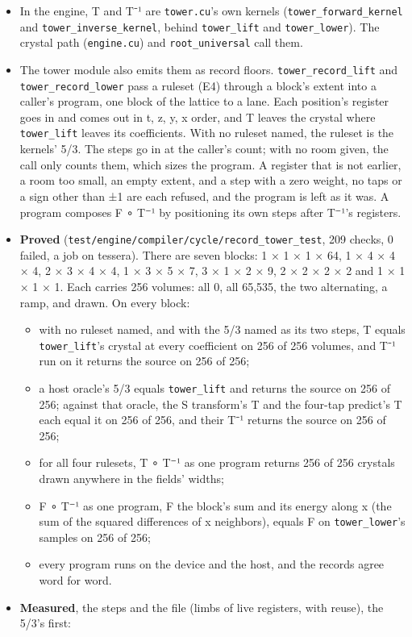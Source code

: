 \begin{itemize}
\begin{itemize}
\begin{itemize}
\item In the engine, T and T⁻¹ are \texttt{tower.\allowbreak{}cu}'s own kernels (\texttt{tower\_\allowbreak{}forward\_\allowbreak{}kernel} and \texttt{tower\_\allowbreak{}inverse\_\allowbreak{}kernel}, behind \texttt{tower\_\allowbreak{}lift} and \texttt{tower\_\allowbreak{}lower}). The crystal path (\texttt{engine.\allowbreak{}cu}) and \texttt{root\_\allowbreak{}universal} call them.
\item The tower module also emits them as record floors. \texttt{tower\_\allowbreak{}record\_\allowbreak{}lift} and \texttt{tower\_\allowbreak{}record\_\allowbreak{}lower} pass a ruleset (E4) through a block's extent into a caller's program, one block of the lattice to a lane. Each position's register goes in and comes out in t, z, y, x order, and T leaves the crystal where \texttt{tower\_\allowbreak{}lift} leaves its coefficients. With no ruleset named, the ruleset is the kernels' 5/3. The steps go in at the caller's count; with no room given, the call only counts them, which sizes the program. A register that is not earlier, a room too small, an empty extent, and a step with a zero weight, no taps or a sign other than ±1 are each refused, and the program is left as it was. A program composes F ∘ T⁻¹ by positioning its own steps after T⁻¹'s registers.
\item \textbf{Proved} (\texttt{test/\allowbreak{}engine/\allowbreak{}compiler/\allowbreak{}cycle/\allowbreak{}record\_\allowbreak{}tower\_\allowbreak{}test}, 209 checks, 0 failed, a job on tessera). There are seven blocks: 1 × 1 × 1 × 64, 1 × 4 × 4 × 4, 2 × 3 × 4 × 4, 1 × 3 × 5 × 7, 3 × 1 × 2 × 9, 2 × 2 × 2 × 2 and 1 × 1 × 1 × 1. Each carries 256 volumes: all 0, all 65,535, the two alternating, a ramp, and drawn. On every block:

\begin{itemize}
\item with no ruleset named, and with the 5/3 named as its two steps, T equals \texttt{tower\_\allowbreak{}lift}'s crystal at every coefficient on 256 of 256 volumes, and T⁻¹ run on it returns the source on 256 of 256;
\item a host oracle's 5/3 equals \texttt{tower\_\allowbreak{}lift} and returns the source on 256 of 256; against that oracle, the S transform's T and the four-tap predict's T each equal it on 256 of 256, and their T⁻¹ returns the source on 256 of 256;
\item for all four rulesets, T ∘ T⁻¹ as one program returns 256 of 256 crystals drawn anywhere in the fields' widths;
\item F ∘ T⁻¹ as one program, F the block's sum and its energy along x (the sum of the squared differences of x neighbors), equals F on \texttt{tower\_\allowbreak{}lower}'s samples on 256 of 256;
\item every program runs on the device and the host, and the records agree word for word.
\end{itemize}
\item \textbf{Measured}, the steps and the file (limbs of live registers, with reuse), the 5/3's first:


\end{itemize}
\end{itemize}
\end{itemize}
